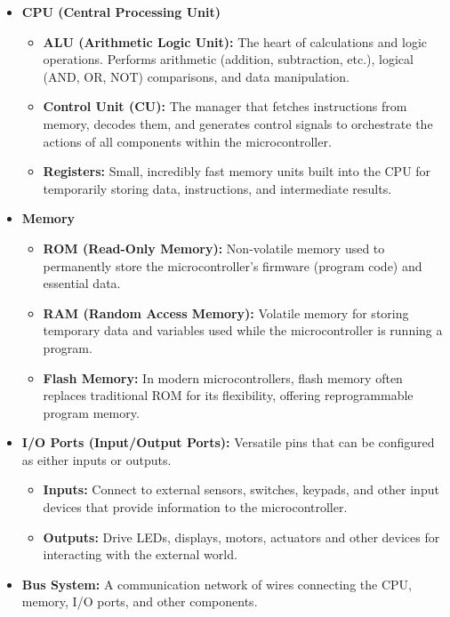 \documentclass[
]{article}
\begin{document}
\begin{itemize}
\item
  \textbf{CPU (Central Processing Unit)}

  \begin{itemize}
  \item
    \textbf{ALU (Arithmetic Logic Unit):} The heart of calculations and
    logic operations. Performs arithmetic (addition, subtraction, etc.),
    logical (AND, OR, NOT) comparisons, and data manipulation.
  \item
    \textbf{Control Unit (CU):} The manager that fetches instructions
    from memory, decodes them, and generates control signals to
    orchestrate the actions of all components within the
    microcontroller.
  \item
    \textbf{Registers:} Small, incredibly fast memory units built into
    the CPU for temporarily storing data, instructions, and intermediate
    results.
  \end{itemize}
\item
  \textbf{Memory}

  \begin{itemize}
  \item
    \textbf{ROM (Read-Only Memory):} Non-volatile memory used to
    permanently store the microcontroller's firmware (program code) and
    essential data.
  \item
    \textbf{RAM (Random Access Memory):} Volatile memory for storing
    temporary data and variables used while the microcontroller is
    running a program.
  \item
    \textbf{Flash Memory:} In modern microcontrollers, flash memory
    often replaces traditional ROM for its flexibility, offering
    reprogrammable program memory.
  \end{itemize}
\item
  \textbf{I/O Ports (Input/Output Ports):} Versatile pins that can be
  configured as either inputs or outputs.

  \begin{itemize}
  \item
    \textbf{Inputs:} Connect to external sensors, switches, keypads, and
    other input devices that provide information to the microcontroller.
  \item
    \textbf{Outputs:} Drive LEDs, displays, motors, actuators and other
    devices for interacting with the external world.
  \end{itemize}
\item
  \textbf{Bus System:} A communication network of wires connecting the
  CPU, memory, I/O ports, and other components.


\end{itemize}
\end{document}
